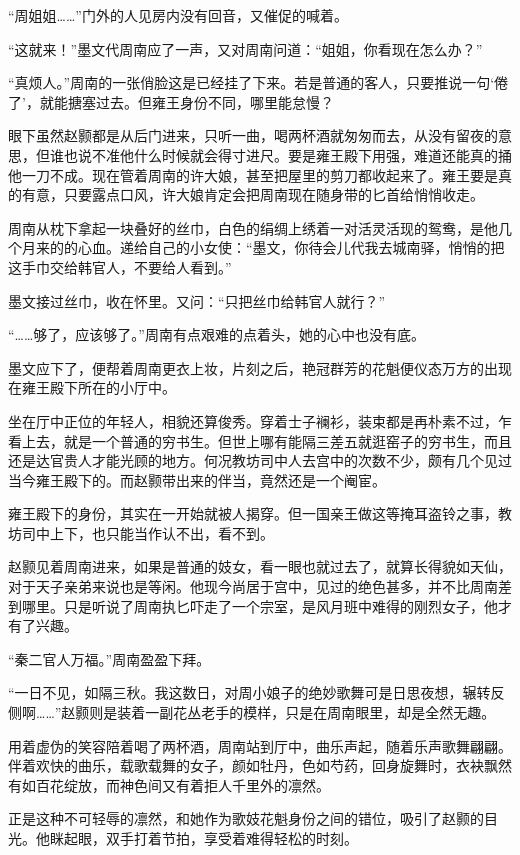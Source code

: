 “周姐姐……”门外的人见房内没有回音，又催促的喊着。

“这就来！”墨文代周南应了一声，又对周南问道：“姐姐，你看现在怎么办？”

“真烦人。”周南的一张俏脸这是已经挂了下来。若是普通的客人，只要推说一句‘倦了’，就能搪塞过去。但雍王身份不同，哪里能怠慢？

眼下虽然赵颢都是从后门进来，只听一曲，喝两杯酒就匆匆而去，从没有留夜的意思，但谁也说不准他什么时候就会得寸进尺。要是雍王殿下用强，难道还能真的捅他一刀不成。现在管着周南的许大娘，甚至把屋里的剪刀都收起来了。雍王要是真的有意，只要露点口风，许大娘肯定会把周南现在随身带的匕首给悄悄收走。

周南从枕下拿起一块叠好的丝巾，白色的绢绸上绣着一对活灵活现的鸳鸯，是他几个月来的的心血。递给自己的小女使：“墨文，你待会儿代我去城南驿，悄悄的把这手巾交给韩官人，不要给人看到。”

墨文接过丝巾，收在怀里。又问：“只把丝巾给韩官人就行？”

“……够了，应该够了。”周南有点艰难的点着头，她的心中也没有底。

墨文应下了，便帮着周南更衣上妆，片刻之后，艳冠群芳的花魁便仪态万方的出现在雍王殿下所在的小厅中。

坐在厅中正位的年轻人，相貌还算俊秀。穿着士子襕衫，装束都是再朴素不过，乍看上去，就是一个普通的穷书生。但世上哪有能隔三差五就逛窑子的穷书生，而且还是达官贵人才能光顾的地方。何况教坊司中人去宫中的次数不少，颇有几个见过当今雍王殿下的。而赵颢带出来的伴当，竟然还是一个阉宦。

雍王殿下的身份，其实在一开始就被人揭穿。但一国亲王做这等掩耳盗铃之事，教坊司中上下，也只能当作认不出，看不到。

赵颢见着周南进来，如果是普通的妓女，看一眼也就过去了，就算长得貌如天仙，对于天子亲弟来说也是等闲。他现今尚居于宫中，见过的绝色甚多，并不比周南差到哪里。只是听说了周南执匕吓走了一个宗室，是风月班中难得的刚烈女子，他才有了兴趣。

“秦二官人万福。”周南盈盈下拜。

“一日不见，如隔三秋。我这数日，对周小娘子的绝妙歌舞可是日思夜想，辗转反侧啊……”赵颢则是装着一副花丛老手的模样，只是在周南眼里，却是全然无趣。

用着虚伪的笑容陪着喝了两杯酒，周南站到厅中，曲乐声起，随着乐声歌舞翩翩。伴着欢快的曲乐，载歌载舞的女子，颜如牡丹，色如芍药，回身旋舞时，衣袂飘然有如百花绽放，而神色间又有着拒人千里外的凛然。

正是这种不可轻辱的凛然，和她作为歌妓花魁身份之间的错位，吸引了赵颢的目光。他眯起眼，双手打着节拍，享受着难得轻松的时刻。

